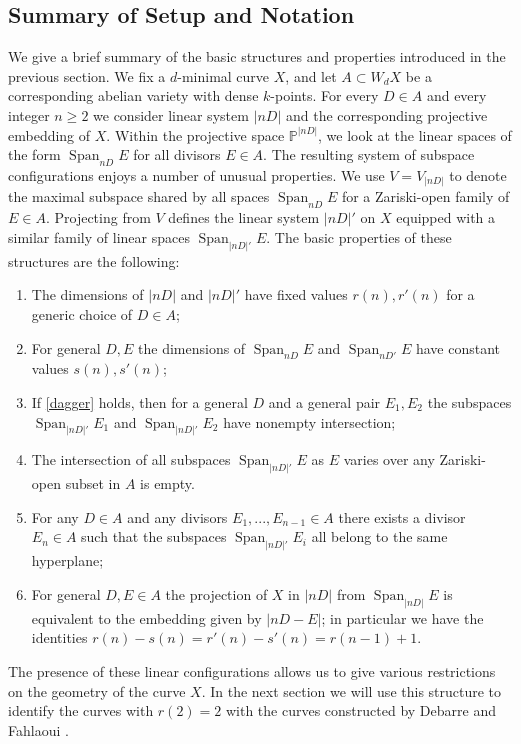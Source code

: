 \documentclass[11pt]{amsart}
\newcommand{\PP}{\mathbb{P}}
\newcommand{\Span}{\operatorname{Span}}
\theoremstyle{definition}
\theoremstyle{remark}
\begin{document}
\subsection{Summary of Setup and Notation}\label{sec:construction-summary}



We give a brief summary of the basic structures and properties introduced in the previous section. We fix a $d$-minimal curve $X$, and let $A \subset W_d X$ be a corresponding abelian variety with dense \(k\)-points. For every $D \in A$ and every integer $n \geqslant 2$ we consider linear system $|nD|$ and the corresponding projective embedding of $X$. Within the projective space $\PP^{|nD|}$, we look at the linear spaces of the form $\Span_{nD} E$ for all divisors $E \in A$. The resulting system of subspace configurations enjoys a number of unusual properties. We use $V=V_{|nD|}$ to denote the maximal subspace shared by all spaces $\Span_{nD} E$ for a Zariski-open family of $E \in A$. Projecting from $V$ defines the linear system $|nD|'$ on $X$ equipped with a similar family of linear spaces $\Span_{|nD|'} E$. The basic properties of these structures are the following:

\begin{enumerate}
    \item The dimensions of $|nD|$ and $|nD|'$ have fixed values $r(n), r'(n)$ for a generic choice of $D \in A$;
    \item For general $D, E$ the dimensions of $\Span_{nD}E$ and $\Span_{nD'} E$ have constant values $s(n), s'(n)$;
    \item If \eqref{dagger} holds, then for a general $D$ and a general pair $E_1, E_2$ the subspaces $\Span_{|nD|'}E_1$ and $\Span_{|nD|'}E_2$ have nonempty intersection; 
    \item The intersection of all subspaces $\Span_{|nD|'} E$ as $E$ varies over any Zariski-open subset in $A$ is empty. 
    \item For any $D\in A$ and any divisors $E_1, ..., E_{n-1} \in A$ there exists a divisor $E_n \in A$ such that the subspaces $\Span_{|nD|'}E_i$ all belong to the same hyperplane;
    \item For general $D, E \in A$ the projection of $X$ in $|nD|$ from $\Span_{|nD|}E$ is equivalent to the embedding given by $|nD - E|$; in particular we have the identities $r(n)-s(n)=r'(n)-s'(n)=r(n-1) + 1.$
\end{enumerate}
The presence of these linear configurations allows us to give various restrictions on the geometry of the curve $X$. In the next section we will use this structure to identify the curves with $r(2)=2$ with the curves constructed by Debarre and Fahlaoui \cite{Debarre-Fahlaoui1993}. 
\end{document}
